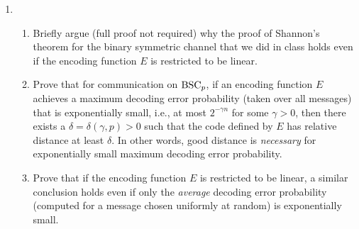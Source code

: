 \documentclass[11pt]{article}
\begin{document}
\begin{enumerate}
\item \begin{enumerate}
\item Briefly argue (full proof not required) why the proof of
  Shannon's theorem for the binary symmetric channel 
that we did in class holds even if the encoding
  function $E$ is restricted to be linear.
\item Prove that for communication on ${\rm BSC}_p$, if an encoding
  function $E$ achieves a maximum decoding error probability (taken
  over all messages) that is exponentially small, i.e., at most
  $2^{-\gamma n}$ for some $\gamma > 0$, then there exists a $\delta =
  \delta(\gamma,p) > 0$ such that the code defined by $E$ has relative
  distance at least $\delta$.  In other words, good distance is {\em
  necessary} for exponentially small maximum decoding error
  probability.
\item Prove that if the encoding function $E$ is restricted to be
  linear, a similar conclusion holds even if only the {\em average}
  decoding error probability (computed for a message chosen uniformly
  at random) is exponentially small.
\end{enumerate}




\end{enumerate}
\end{document}

